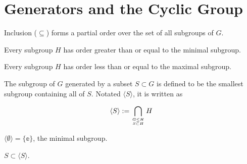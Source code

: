 \section{Generators and the Cyclic Group}

\begin{theorem}
    \label{theorem : subgroupOrder}
    \leanok
    Inclusion ($\subseteq$) forms a partial order over the set of all subgroups of $G$.
\end{theorem}

\begin{theorem}
    \label{theorem : Minimal_smallest}
    \leanok
    Every subgroup $H$ has order greater than or equal to the minimal subgroup.
\end{theorem}

\begin{theorem}
    \label{theorem : Maximal_largest}
    \leanok
    Every subgroup $H$ has order less than or equal to the maximal subgroup.
\end{theorem}

\begin{definition}
    \label{definition : Generate}
    \leanok
    The subgroup of $G$ generated by a subset $S \subset G$ is defined to be the smallest subgroup containing all of $S$. Notated $\langle S \rangle$, it is written as

    \begin{equation*}
        \langle S \rangle := \bigcap_{\genfrac{}{}{0pt}{}{G \le H}{S \subset H}} H
    \end{equation*}
\end{definition}

\begin{theorem}
    \label{theorem : Generate_empty}
    \leanok
    $\langle \emptyset \rangle = \{\mathbb{e}\}$, the minimal subgroup.
\end{theorem}

\begin{theorem}
    \label{theorem : Generate_contain_set}
    \leanok
    $S \subset \langle S \rangle$.
\end{theorem}

